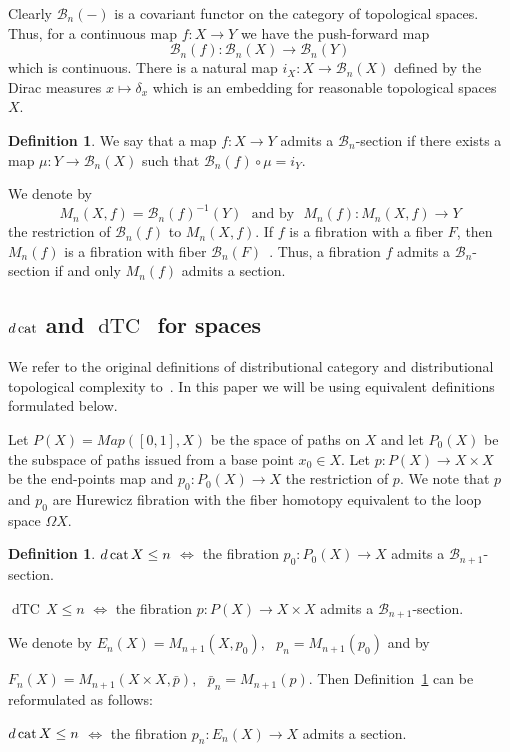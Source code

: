 \documentclass{amsart}
\numberwithin{equation}{section}
\theoremstyle{plain}
\theoremstyle{definition}
\newtheorem{defin}[thm]{Definition}
\def\dTC{{\mathop\mathrm{dTC}\,}}
\def\cat{\protect\operatorname{cat}}
\begin{document}
Clearly $\mathcal B_n(-)$ is a covariant functor on the category of topological spaces. 
Thus, for a continuous map $f:X\to Y$ we have the push-forward map $$\mathcal B_n(f):\mathcal B_n(X)\to\mathcal B_n(Y)$$
which is continuous.
There is a natural map $i_X:X\to\mathcal B_n(X)$ defined by the Dirac measures $x\mapsto \delta_x$ which is an embedding for reasonable topological spaces $X$. 
\begin{defin}
We say that a map $f:X\to Y$ admits a $\mathcal B_n$-section if there exists a map $\mu:Y\to\mathcal B_n(X)$ such that $\mathcal B_n(f)\circ\mu=i_Y$.
\end{defin}
We denote by $$M_n(X,f)=\mathcal B_n(f)^{-1}(Y)\ \ \ \text{and by} \ \ \ M_n(f):M_n(X,f)\to Y$$ the restriction of $\mathcal B_n(f)$ to $M_n(X,f)$.
If $f$ is a fibration with a fiber $F$, then $M_n(f)$ is a fibration with fiber $\mathcal B_n(F)$~\cite{DJ,KW1}.
Thus, a fibration $f$ admits a $\mathcal B_n$-section if and only $M_n(f)$ admits a section. 



\subsection {$d\cat$ and $\dTC$ for spaces}
We refer to the original definitions of distributional category and distributional topological complexity to~\cite{DJ,KW1}.
In this paper we will be using equivalent definitions formulated  below. 

Let $P(X)=Map([0,1],X)$ be the space of paths on $X$ and let $P_0(X)$ be the subspace of paths issued from a base point $x_0\in X$.
Let $p:P(X)\to X\times X$ be the end-points map and $p_0:P_0(X)\to X$ the restriction of $p$. We note that $p$ and $p_0$ are Hurewicz fibration with the fiber homotopy equivalent to the loop space $\Omega X$.


\begin{defin}\label{dcat}
$d\cat X\le n$ $\Leftrightarrow$ the fibration $p_0:P_0(X)\to X$ admits a $\mathcal B_{n+1}$-section.

$\dTC X\le n$ $\Leftrightarrow$ the fibration $p:P(X)\to X\times X$ admits a $\mathcal B_{n+1}$-section.
\end{defin}
We denote by $E_n(X)=M_{n+1}(X,p_0),\ \ \ p_n=M_{n+1}(p_0)$ and  by 

$F_n(X)=M_{n+1}(X\times X,\bar p),\ \ \ \bar p_n=M_{n+1}(p)$. 
Then Definition~\ref{dcat} 
can be reformulated as follows:

$d\cat X\le n$ $\Leftrightarrow$ the fibration $p_n:E_n(X)\to X$ admits a section.
\end{document}
